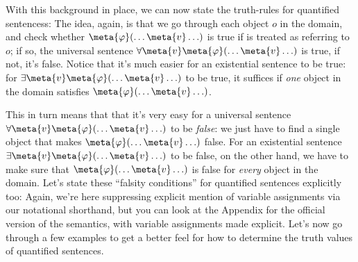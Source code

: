 With this background in place, we can now state the truth-rules for quantified sentencess:
The idea, again, is that we go through each object $o$ in the domain, and check whether $\meta{\varphi}(\ldots \meta{v} \ldots)$ is true if  is treated as referring to $o$; if so, the universal sentence $\forall \meta{v}\meta{\varphi}(\ldots \meta{v} \ldots)$ is true, if not, it's false.  Notice that it's much easier for an existential sentence to be true: for $\exists \meta{v}\meta{\varphi}(\ldots \meta{v} \ldots)$ to be true, it suffices if \emph{one} object in the domain satisfies $\meta{\varphi}(\ldots \meta{v} \ldots)$.


This in turn means that that it's very easy for a universal sentence $\forall \meta{v}\meta{\varphi}(\ldots \meta{v} \ldots)$ to be \emph{false}: we just have to find a single object that makes $\meta{\varphi}(\ldots \meta{v} \ldots)$ false.  For an existential sentence $\exists \meta{v}\meta{\varphi}(\ldots \meta{v} \ldots)$ to be false, on the other hand, we have to make sure that $\meta{\varphi}(\ldots \meta{v} \ldots)$ is false for \emph{every} object in the domain. Let's state these ``falsity conditions'' for quantified sentences explicitly too:
Again, we're here suppressing explicit mention of variable assignments via our notational shorthand, but you can look at the Appendix for the official version of the semantics, with variable assignments made explicit.  Let's now go through a few examples to get a better feel for how to determine the truth values of quantified sentences.






